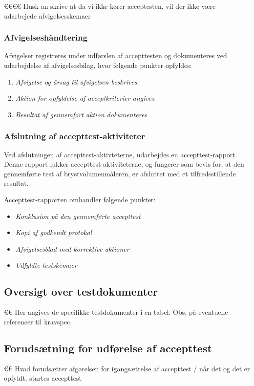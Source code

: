 €€€€ Husk an skrive at da vi ikke kører acceptesten, vil der ikke være udarbejede afvigelsesskemaer
			\subsubsection{Afvigelseshåndtering}	
			Afvigelser registreres under udførslen af accepttesten og dokumenteres ved udarbejdelse af afvigelsesbilag, hvor følgende punkter opfyldes:
			
			\begin{enumerate}[label=\alph*)]
				\item \textit{Afvigelse og årsag til afvigelsen beskrives}
				\item \textit{Aktion for opfyldelse af acceptkriterier angives}
				\item \textit{Resultat af gennemført aktion dokumenteres}	
			\end{enumerate}
			
			\subsubsection{Afslutning af accepttest-aktiviteter}
			Ved afslutningen af accepttest-aktivteterne, udarbejdes en accepttest-rapport. Denne rapport lukker accepttest-aktiviteterne, og fungerer som bevis for, at den gennemførte test af brystvolumenmåleren, er afsluttet med et tilfredsstillende resultat. 
			
			Accepttest-rapporten omhandler følgende punkter: 
			\begin{itemize}
				\item \textit{Konklusion på den gennemførte accepttest}
				\item \textit{Kopi af godkendt protokol}
				\item \textit{Afvigelsesblad med korrektive aktioner}
				\item \textit{Udfyldte testskemaer}
			\end{itemize}
			
		\subsection{Oversigt over testdokumenter}
		€€ Her angives de specifikke testdokumenter i en tabel. Obs, på eventuelle referencer til kravspec. 
		
		\subsection{Forudsætning for udførelse af accepttest}
		€€ Hvad forudsætter afgørelsen for igangsættelse af accepttest / når det og det er opfyldt, startes accepttest 
		
